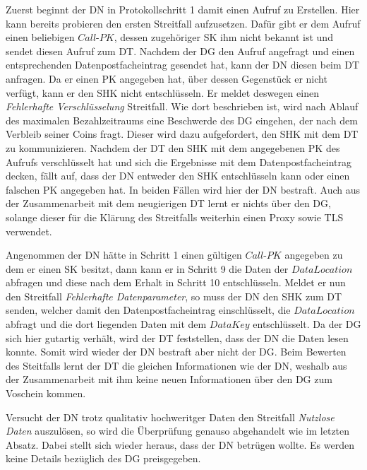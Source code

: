 \documentclass[
	fontsize=11pt,
	headings=small,
	parskip=half,           %
	bibliography=totoc,
	numbers=noenddot,       %
	open=any,               %
]{scrreprt}
\begin{document}
Zuerst beginnt der DN in Protokollschritt 1 damit einen Aufruf zu Erstellen. Hier kann bereits probieren den ersten Streitfall aufzusetzen. Dafür gibt er dem Aufruf einen beliebigen $Call$-$PK$, dessen zugehöriger SK ihm nicht bekannt ist und sendet diesen Aufruf zum DT. Nachdem der DG den Aufruf angefragt und einen entsprechenden Datenpostfacheintrag gesendet hat, kann der DN diesen beim DT anfragen. Da er einen PK angegeben hat, über dessen Gegenstück er nicht verfügt, kann er den SHK nicht entschlüsseln. Er meldet deswegen einen \textit{Fehlerhafte Verschlüsselung} Streitfall. Wie dort beschrieben ist, wird nach Ablauf des maximalen Bezahlzeitraums eine Beschwerde des DG eingehen, der nach dem Verbleib seiner Coins fragt. Dieser wird dazu aufgefordert, den SHK mit dem DT zu kommunizieren. Nachdem der DT den SHK mit dem angegebenen PK des Aufrufs verschlüsselt hat und sich die Ergebnisse mit dem Datenpostfacheintrag decken, fällt auf, dass der DN entweder den SHK entschlüsseln kann oder einen falschen PK angegeben hat. In beiden Fällen wird hier der DN bestraft. Auch aus der Zusammenarbeit mit dem neugierigen DT lernt er nichts über den DG, solange dieser für die Klärung des Streitfalls weiterhin einen Proxy sowie TLS verwendet.

Angenommen der DN hätte in Schritt 1 einen gültigen $Call$-$PK$ angegeben zu dem er einen SK besitzt, dann kann er in Schritt 9 die Daten der $DataLocation$ abfragen und diese nach dem Erhalt in Schritt 10 entschlüsseln. Meldet er nun den Streitfall \textit{Fehlerhafte Datenparameter}, so muss der DN den SHK zum DT senden, welcher damit den Datenpostfacheintrag einschlüsselt,  die $DataLocation$ abfragt und die dort liegenden Daten mit dem $DataKey$ entschlüsselt. Da der DG sich hier gutartig verhält, wird der DT feststellen, dass der DN die Daten lesen konnte. Somit wird wieder der DN bestraft aber nicht der DG. Beim Bewerten des Steitfalls lernt der DT die gleichen Informationen wie der DN, weshalb aus der Zusammenarbeit mit ihm keine neuen Informationen über den DG zum Voschein kommen.

Versucht der DN trotz qualitativ hochweritger Daten den Streitfall \textit{Nutzlose Daten} auszulösen, so wird die Überprüfung genauso abgehandelt wie im letzten Absatz. Dabei stellt sich wieder heraus, dass der DN betrügen wollte. Es werden keine Details bezüglich des DG preisgegeben.
\end{document}

